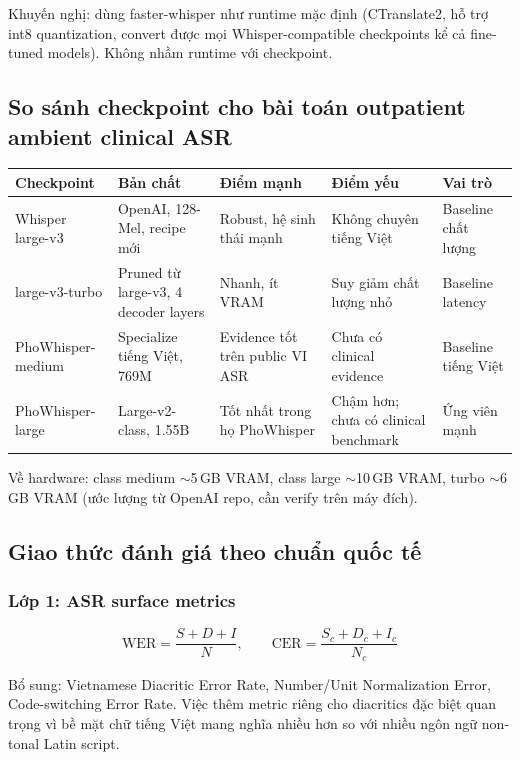 Khuyến nghị: dùng faster-whisper như runtime mặc định (CTranslate2, hỗ trợ int8 quantization, convert được mọi Whisper-compatible checkpoints kể cả fine-tuned models). Không nhầm runtime với checkpoint.

\subsection{So sánh checkpoint cho bài toán outpatient ambient clinical ASR}

\begin{small}
\begin{longtable}{p{2.8cm} p{3cm} p{3.5cm} p{2.5cm} p{2.2cm}}
\toprule
\textbf{Checkpoint} & \textbf{Bản chất} & \textbf{Điểm mạnh} & \textbf{Điểm yếu} & \textbf{Vai trò} \\
\midrule
Whisper large-v3 & OpenAI, 128-Mel, recipe mới & Robust, hệ sinh thái mạnh & Không chuyên tiếng Việt & Baseline chất lượng \\
\midrule
large-v3-turbo & Pruned từ large-v3, 4 decoder layers & Nhanh, ít VRAM & Suy giảm chất lượng nhỏ & Baseline latency \\
\midrule
PhoWhisper-medium & Specialize tiếng Việt, 769M & Evidence tốt trên public VI ASR & Chưa có clinical evidence & Baseline tiếng Việt \\
\midrule
PhoWhisper-large & Large-v2-class, 1.55B & Tốt nhất trong họ PhoWhisper & Chậm hơn; chưa có clinical benchmark & Ứng viên mạnh \\
\bottomrule
\end{longtable}
\end{small}

Về hardware: class medium $\sim$5\,GB VRAM, class large $\sim$10\,GB VRAM, turbo $\sim$6\,GB VRAM (ước lượng từ OpenAI repo, cần verify trên máy đích).

\subsection{Giao thức đánh giá theo chuẩn quốc tế}

\subsubsection{Lớp 1: ASR surface metrics}

\[
\text{WER} = \frac{S + D + I}{N}, \qquad \text{CER} = \frac{S_c + D_c + I_c}{N_c}
\]

Bổ sung: Vietnamese Diacritic Error Rate, Number/Unit Normalization Error, Code-switching Error Rate. Việc thêm metric riêng cho diacritics đặc biệt quan trọng vì bề mặt chữ tiếng Việt mang nghĩa nhiều hơn so với nhiều ngôn ngữ non-tonal Latin script.

